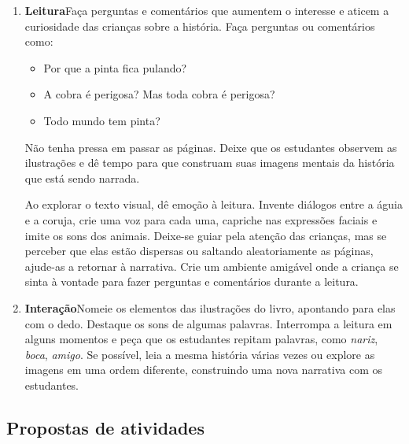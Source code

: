 \documentclass[11pt]{extarticle}
\begin{document}
\begin{enumerate}
\item \textbf{Leitura}\quad Faça perguntas e comentários que aumentem o 
interesse e aticem a curiosidade das crianças sobre a história. Faça 
perguntas ou comentários como: 

\begin{itemize}
\item Por que a pinta fica pulando?
\item A cobra é perigosa? Mas toda cobra é perigosa?
\item Todo mundo tem pinta?
\end{itemize}

Não tenha pressa em passar as páginas. Deixe que os estudantes 
observem as ilustrações e dê tempo para que construam suas imagens 
mentais da história que está sendo narrada. 

Ao explorar o texto visual, dê emoção 
à leitura. Invente diálogos entre a águia e a coruja, crie uma voz para 
cada uma, capriche nas expressões faciais e imite os sons dos animais.
Deixe-se guiar pela atenção das crianças, mas se perceber que 
elas estão dispersas ou saltando aleatoriamente as páginas, ajude-as 
a retornar à narrativa. Crie um ambiente amigável onde a criança 
se sinta à vontade para fazer perguntas e comentários durante a leitura.


\item \textbf{Interação}\quad Nomeie os elementos das ilustrações 
do livro, apontando para elas com o dedo. Destaque os sons de algumas 
palavras. Interrompa a leitura em alguns momentos e peça que 
os estudantes repitam palavras, como \textit{nariz}, \textit{boca}, \textit{amigo}. Se possível, 
leia a mesma história várias vezes ou explore as imagens em uma ordem 
diferente, construindo uma nova narrativa com os estudantes. 
\end{enumerate}


\subsection{Propostas de atividades}

\end{document}
